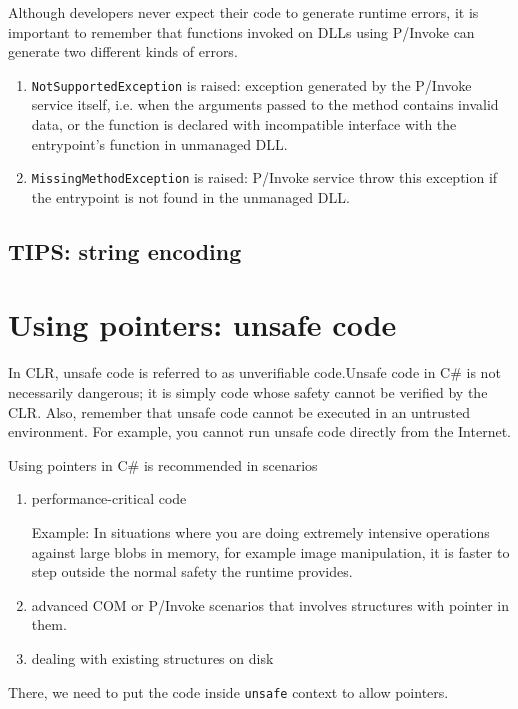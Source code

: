 Although developers never expect their code to generate runtime errors, it is
important to remember that functions invoked on DLLs using P/Invoke can generate
two different kinds of errors.
\begin{enumerate}
  \item \verb!NotSupportedException! is raised: exception generated by the
  P/Invoke service itself, i.e. when the arguments passed to the method
  contains invalid data, or the function is declared with incompatible interface with the entrypoint's function in
  unmanaged DLL.
  
  \item \verb!MissingMethodException! is raised: P/Invoke service throw this
  exception if the entrypoint is not found in the unmanaged DLL.
\end{enumerate}


\subsection{TIPS: string encoding}


\section{Using pointers: unsafe code}

In CLR,  unsafe code is referred to as unverifiable code.Unsafe code in C\# is
not necessarily dangerous; it is simply code whose safety cannot be verified by
the CLR. Also, remember that  unsafe code cannot be executed in an untrusted environment.
For example, you cannot run unsafe code directly from the Internet.


Using pointers in C\# is recommended in scenarios
\begin{enumerate}
  \item performance-critical code
  
Example: In situations where you are doing extremely intensive operations
against large blobs in memory, for example image manipulation, it is faster to
step outside the normal safety the runtime provides.


  \item advanced COM or P/Invoke scenarios that involves structures with pointer
  in them.
  \item dealing with existing structures on disk
\end{enumerate}

There, we need to put the code inside \verb!unsafe! context to allow pointers.

